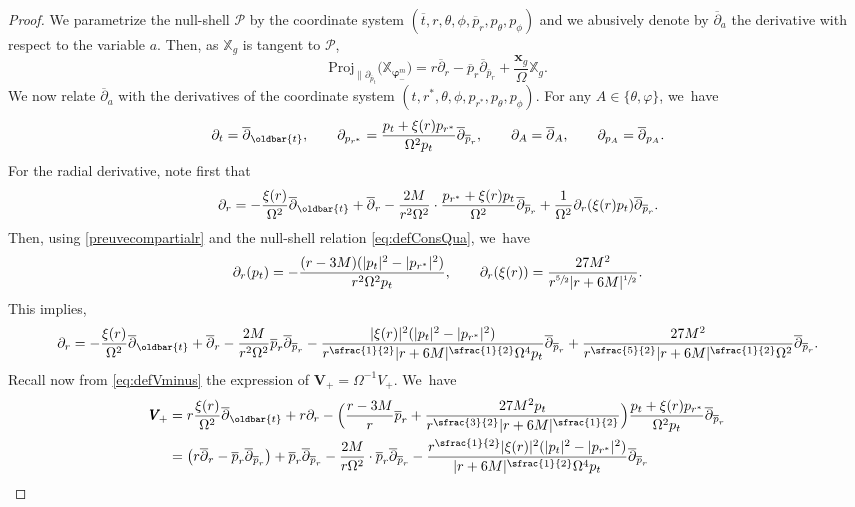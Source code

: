 \documentclass[10pt]{amsart}
\let\bar\oldbar
\theoremstyle{plain}
\theoremstyle{definition}
\newcommand\T{{\mathbb{X}}}
\begin{document}
\begin{proof}
We parametrize the null-shell $\mathcal{P}$ by the coordinate system $\!(\overline{t},r,\theta,\phi, \overline{p}_r, p_\theta, p_\phi)$ and we abusively denote by $\overline{\partial}_a$ the derivative with respect to the variable $a$. Then, as $\T_g$ is tangent to $\mathcal{P}$,
\[
\mathrm{Proj}_{\parallel \partial_{\overline{p}_t}} \bigl(\T_{\pmb{\varphi}_-^m} \bigr) = r \overline{\partial}_r-\overline{p}_r \overline{\partial}_{\overline{p}_r}+\frac{\pmb{x}_g}{\Omega} \T_g.
\]
We now relate $\overline{\partial}_a$ with the derivatives of the coordinate system $(t,r^*,\theta, \phi,p_{r^*},p_\theta, p_\phi)$. For any $A \in \{ \theta, \varphi \}$, we~have
\[
\partial_{t}= \overline{\partial}_{\bar{t}}, \qquad \partial_{p_{r^*}}= \frac{p_t+\xi(r)p_{r^*}}{\Omega^2 p_t} \overline{\partial}_{\overline{p}_r}, \qquad \partial_A = \overline{\partial}_A, \qquad \partial_{p_A}=\overline{\partial}_{p_A}.
\]
For the radial derivative, note first that
\[
\partial_r = -\frac{\xi(r)}{ \Omega^2} \overline{\partial}_{\bar{t}}+\overline{\partial}_r-\frac{2M}{r^2\Omega^2} \cdot \frac{p_{r^*}+\xi(r)p_t}{\Omega^2} \overline{\partial}_{\overline{p}_r}+\frac{1}{\Omega^2} \partial_r (\xi(r)p_t)\overline{\partial}_{\overline{p}_r}.
\]
Then, using \eqref{preuvecompartialr} and the null-shell relation \eqref{eq:defConsQua}, we~have
\[
\partial_r (p_t) = - \frac{(r-3M)(|p_t|^2-|p_{r^*}|^2)}{r^2 \Omega^2 p_t},\qquad \partial_r (\xi(r)) = \frac{27M^2}{r^{\sfrac{5}{2}} |r+6M|^{\sfrac{1}{2}} }.
\]
This implies,
\[
\partial_r = -\frac{\xi(r)}{ \Omega^2} \overline{\partial}_{\bar{t}}+\overline{\partial}_r-\frac{2M}{r^2\Omega^2} \overline{p}_r \overline{\partial}_{\overline{p}_r}-\frac{|\xi (r)|^2(|p_t|^2-|p_{r^*}|^2)}{r^{\sfrac{1}{2}}|r+6M|^{\sfrac{1}{2}}\Omega^4p_t} \overline{\partial}_{\overline{p}_r} +\frac{27M^2}{r^{\sfrac{5}{2}} |r+6M|^{\sfrac{1}{2}} \Omega^2} \overline{\partial}_{\overline{p}_r}.
\]
Recall now from \eqref{eq:defVminus} the expression of $\pmb{V}_{\! +}=\Omega^{-1}V_+$. We~have
\begin{align*}
\pmb{V}_{\! +} & = r\frac{\xi(r)}{ \Omega^2} \overline{\partial}_{\bar{t}}+r\partial_r - \Bigl(\frac{r-3M}{r} \overline{p}_r +\frac{27M^2 p_t}{r^{\sfrac{3}{2}}|r+6M|^{\sfrac{1}{2}}} \Bigr) \frac{p_t+\xi(r)p_{r^*}}{ \Omega^2p_t}\overline{\partial}_{\overline{p}_r} \\
& = \bigl(r \overline{\partial}_r-\overline{p}_r \overline{\partial}_{\overline{p}_r} \bigr)+\overline{p}_r \overline{\partial}_{\overline{p}_r} -\frac{2M}{r\Omega^2} \cdot \overline{p}_r \overline{\partial}_{\overline{p}_r}-\frac{r^{\sfrac{1}{2}}|\xi(r)|^2(|p_t|^2-|p_{r^*}|^2)}{|r+6M|^{\sfrac{1}{2}}\Omega^4p_t} \overline{\partial}_{\overline{p}_r} \\

\end{align*}
\end{proof}
\end{document}

